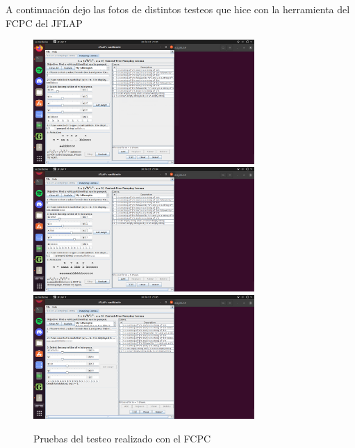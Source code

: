 \documentclass[11pt]{article}
\begin{document}
A continuación dejo las fotos de distintos testeos que hice con la herramienta del FCPC del JFLAP
\begin{figure}[htb]
	\centering
	\includegraphics[width=0.75\textwidth]{3.1.png}
	\includegraphics[width=0.75\textwidth]{3.2.png}
	\includegraphics[width=0.75\textwidth]{3.3.png}
	\caption{Pruebas del testeo realizado con el FCPC}
\end{figure}
\end{document}
